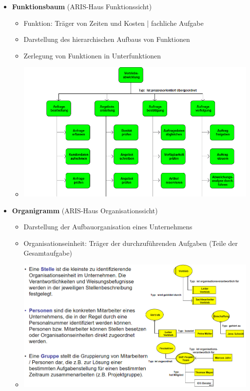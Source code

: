 \documentclass[11pt,a4paper]{article}
\begin{document}
\begin{itemize}
	\pagebreak
	
	\item \textbf{Funktionsbaum} (ARIS-Haus Funktionssicht)
		\begin{itemize}
		\item Funktion: Träger von Zeiten und Kosten | fachliche Aufgabe
		\item Darstellung des hierarchischen Aufbaus von Funktionen
		\item Zerlegung von Funktionen in Unterfunktionen
		\item[] \includegraphics[width=15cm]{Bilder/funktionen}
		\end{itemize}
		
	\item \textbf{Organigramm} (ARIS-Haus Organisationssicht)
		\begin{itemize}
		\item Darstellung der Aufbauorganisation eines Unternehmens
		\item Organisationseinheit: Träger der durchzuführenden Aufgaben (Teile der Gesamtaufgabe)
		\item[] \includegraphics[width=15cm]{Bilder/organi}
		\end{itemize}
	

\end{itemize}
\end{document}
